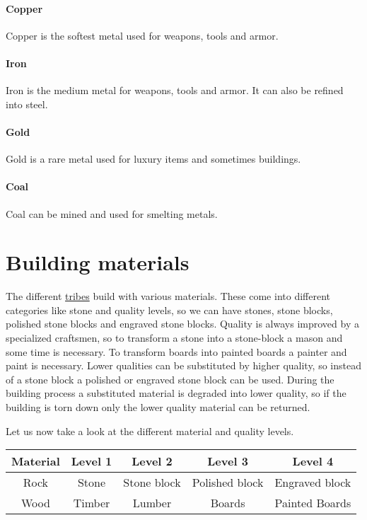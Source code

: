 \paragraph{Copper}
Copper is the softest metal used for weapons, tools and armor.

\paragraph{Iron}
Iron is the medium metal for weapons, tools and armor. It can also be refined
into steel.

\paragraph{Gold}
Gold is a rare metal used for luxury items and sometimes buildings.

\paragraph{Coal}
Coal can be mined and used for smelting metals.

\section{Building materials}\label{ch:Goods:Materials}
The different \hyperref[ch:Tribes]{tribes} build with various materials. These
come into different categories like stone and quality levels, so we can have
stones, stone blocks, polished stone blocks and engraved stone blocks. Quality
is always improved by a specialized craftsmen, so to transform a stone into a
stone-block a mason and some time is necessary. To transform boards into
painted boards a painter and paint is necessary. Lower qualities can be
substituted by higher quality, so instead of a stone block a polished or
engraved stone block can be used. During the building process a substituted
material is degraded into lower quality, so if the building is torn down only
the lower quality material can be returned.

Let us now take a look at the different material and quality levels.
\begin{longtable}{ccccc}
	\toprule
	Material & Level 1      & Level 2     & Level 3        & Level 4        \\
	\midrule
	Rock     & Stone        & Stone block & Polished block & Engraved block \\
	Wood     & \Gls{Timber} & Lumber      & Boards         & Painted Boards \\
\end{longtable}

